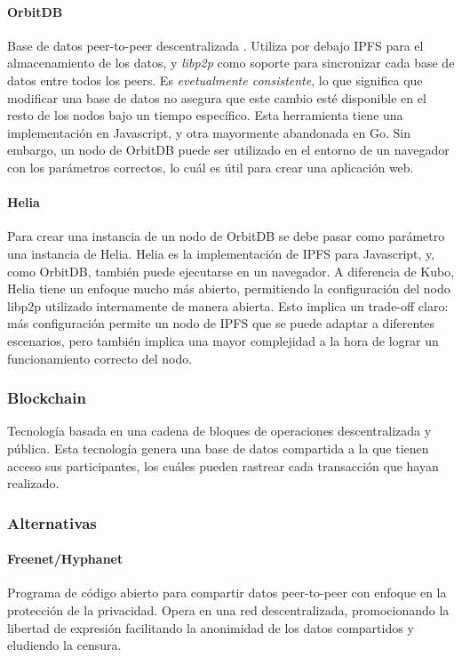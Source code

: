 \paragraph{OrbitDB} Base de datos peer-to-peer descentralizada \cite{orbitdb}. Utiliza por debajo IPFS para el almacenamiento de los datos, y \textit{libp2p} como soporte para sincronizar cada base de datos entre todos los peers. Es \textit{evetualmente consistente}, lo que significa que modificar una base de datos no asegura que este cambio esté disponible en el resto de los nodos bajo un tiempo específico. Esta herramienta tiene una implementación en Javascript, y otra mayormente abandonada en Go. Sin embargo, un nodo de OrbitDB puede ser utilizado en el entorno de un navegador con los parámetros correctos, lo cuál es útil para crear una aplicación web.

\paragraph{Helia} Para crear una instancia de un nodo de OrbitDB se debe pasar como parámetro una instancia de Helia. Helia \cite{helia} es la implementación de IPFS para Javascript, y, como OrbitDB, también puede ejecutarse en un navegador. A diferencia de Kubo, Helia tiene un enfoque mucho más abierto, permitiendo la configuración del nodo libp2p utilizado internamente de manera abierta. Esto implica un trade-off claro: más configuración permite un nodo de IPFS que se puede adaptar a diferentes escenarios, pero también implica una mayor complejidad a la hora de lograr un funcionamiento correcto del nodo.

\subsubsection{Blockchain}
Tecnología basada en una cadena de bloques de operaciones descentralizada y pública.  Esta tecnología genera una base de datos compartida a la que tienen acceso sus participantes, los cuáles pueden rastrear cada transacción que hayan realizado.\parencite{blockchain}




\subsubsection{Alternativas}
\paragraph{Freenet/Hyphanet}
Programa de código abierto para compartir datos peer-to-peer con enfoque en la protección de la privacidad. Opera en una red descentralizada, promocionando la libertad de expresión facilitando la anonimidad de los datos compartidos y eludiendo la censura.\cite{freenet}\cite{hyphanet}
